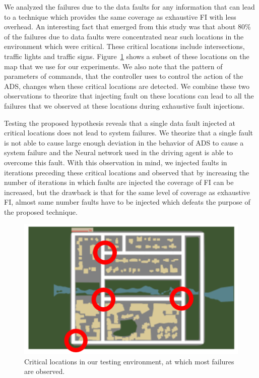 We analyzed the failures due to the data faults for any information that can lead to a technique which provides the same coverage as exhaustive FI with less overhead. An interesting fact that emerged from this study was that about 80\% of the failures due to data faults were concentrated near such locations in the environment which were critical. These critical locations include intersections, traffic lights and traffic signs. Figure~\ref{fig:map_critical} shows a subset of these locations on the map that we use for our experiments. We also note that the pattern of parameters of commands, that the controller uses to control the action of the ADS, changes when these critical locations are detected. We combine these two observations to theorize that injecting fault on these locations can lead to all the failures that we observed at these locations during exhaustive fault injections.

Testing the proposed hypothesis reveals that a single data fault injected at critical locations does not lead to system failures. We theorize that a single fault is not able to cause large enough deviation in the behavior of ADS to cause a system failure and the Neural network used in the driving agent is able to overcome this fault. With this observation in mind, we injected faults in iterations preceding these critical locations and observed that by increasing the number of iterations in which faults are injected the coverage of FI can be increased, but the drawback is that for the same level of coverage as exhaustive FI, almost same number faults have to be injected which defeats the purpose of the proposed technique.   

\begin{figure}  
	\vspace{1.0em}
	\centering
	\includegraphics[scale=0.7]{map_critical}
	\vspace{-0.5em}
	\caption{Critical locations in our testing environment, at which most failures are observed.}
	\label{fig:map_critical}
	\vspace{-1.5em}
\end{figure}  


